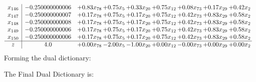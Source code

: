\documentclass[8pt]{article}
\begin{document}
\[\begin{array}{c| c c@{\hskip 2pt} c@{\hskip 2pt} c@{\hskip 2pt} c@{\hskip 2pt} c@{\hskip 2pt} c@{\hskip 2pt} c@{\hskip 2pt} }
 x_{146}   &  -0.250000000006 & +  0.83 x_{78} & +  0.75 x_{5} & +  0.33 x_{20} & +  0.75 x_{12} & +  0.08 x_{73} & +  0.17 x_{29} & +  0.42 x_{2}\\
 x_{147}   &  -0.250000000007 & +  0.17 x_{78} & +  0.75 x_{5} & +  0.17 x_{20} & +  0.75 x_{12} & +  0.42 x_{73} & +  0.83 x_{29} & +  0.58 x_{2}\\
 x_{148}   &  -0.250000000008 & +  0.17 x_{78} & +  0.75 x_{5} & +  0.17 x_{20} & +  0.75 x_{12} & +  0.42 x_{73} & +  0.83 x_{29} & +  0.58 x_{2}\\
 x_{149}   &  -0.250000000006 & +  0.17 x_{78} & +  0.75 x_{5} & +  0.17 x_{20} & +  0.75 x_{12} & +  0.42 x_{73} & +  0.83 x_{29} & +  0.58 x_{2}\\
 x_{150}   &  -0.250000000006 & +  0.17 x_{78} & +  0.75 x_{5} & +  0.17 x_{20} & +  0.75 x_{12} & +  0.42 x_{73} & +  0.83 x_{29} & +  0.58 x_{2}\\
\hline
z    &  4.0 & +  0.00 x_{78} & -2.00 x_{5} & -1.00 x_{20} & +  0.00 x_{12} & -0.00 x_{73} & +  0.00 x_{29} & +  0.00 x_{2}\\
\end{array}\]
Forming the dual dictionary:

The Final Dual Dictionary is: 
\end{document}
